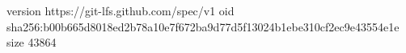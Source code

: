 version https://git-lfs.github.com/spec/v1
oid sha256:b00b665d8018ed2b78a10e7f672ba9d77d5f13024b1ebe310cf2ec9e43554e1e
size 43864
